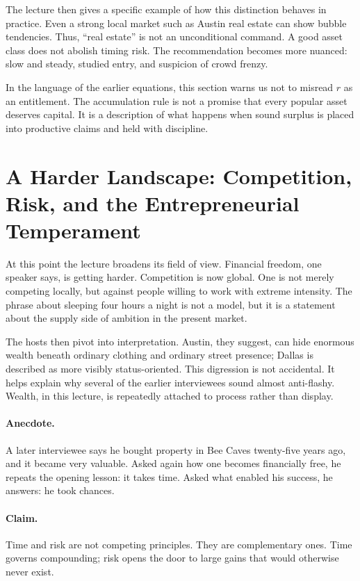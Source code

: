 The lecture then gives a specific example of how this distinction behaves in practice. Even a strong local market such as Austin real estate can show bubble tendencies. Thus, ``real estate'' is not an unconditional command. A good asset class does not abolish timing risk. The recommendation becomes more nuanced: slow and steady, studied entry, and suspicion of crowd frenzy.

In the language of the earlier equations, this section warns us not to misread $r$ as an entitlement. The accumulation rule is not a promise that every popular asset deserves capital. It is a description of what happens when sound surplus is placed into productive claims and held with discipline.

\section{A Harder Landscape: Competition, Risk, and the Entrepreneurial Temperament}

At this point the lecture broadens its field of view. Financial freedom, one speaker says, is getting harder. Competition is now global. One is not merely competing locally, but against people willing to work with extreme intensity. The phrase about sleeping four hours a night is not a model, but it is a statement about the supply side of ambition in the present market.

The hosts then pivot into interpretation. Austin, they suggest, can hide enormous wealth beneath ordinary clothing and ordinary street presence; Dallas is described as more visibly status-oriented. This digression is not accidental. It helps explain why several of the earlier interviewees sound almost anti-flashy. Wealth, in this lecture, is repeatedly attached to process rather than display.

\paragraph{Anecdote.}
A later interviewee says he bought property in Bee Caves twenty-five years ago, and it became very valuable. Asked again how one becomes financially free, he repeats the opening lesson: it takes time. Asked what enabled his success, he answers: he took chances.

\paragraph{Claim.}
Time and risk are not competing principles. They are complementary ones. Time governs compounding; risk opens the door to large gains that would otherwise never exist.

